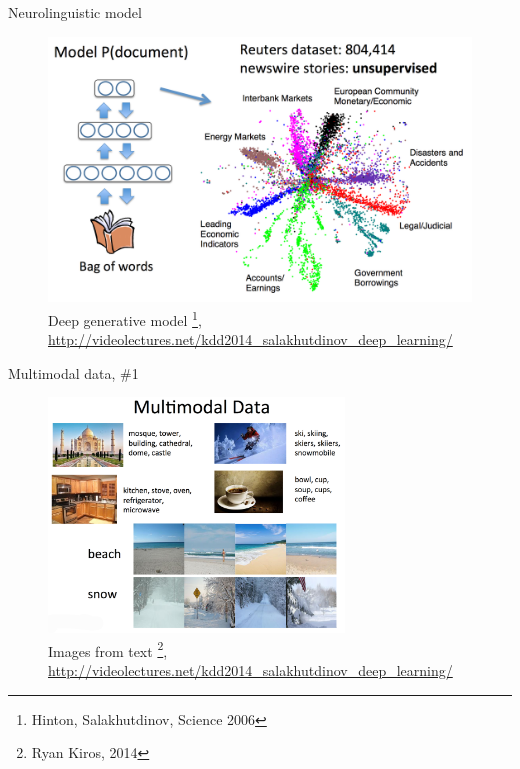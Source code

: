 \documentclass[10pt]{beamer}
\begin{document}
\begin{frame}{Neurolinguistic model}


\begin{figure}[h!]
	\centering
	\includegraphics[width=1\textwidth]{images/neurolinguistic.png}
	\caption{Deep generative model \footnote{Hinton, Salakhutdinov, Science 2006},\\ \url{http://videolectures.net/kdd2014_salakhutdinov_deep_learning/}}
\end{figure} 

\end{frame}


\begin{frame}{Multimodal data, \#1}

\begin{figure}[h!]
	\centering
	\includegraphics[width=0.7\textwidth]{images/multimodal1.png}
	\caption{Images from text \footnote{Ryan Kiros, 2014},\\ \url{http://videolectures.net/kdd2014_salakhutdinov_deep_learning/}}
\end{figure} 

\end{frame}
\end{document}
